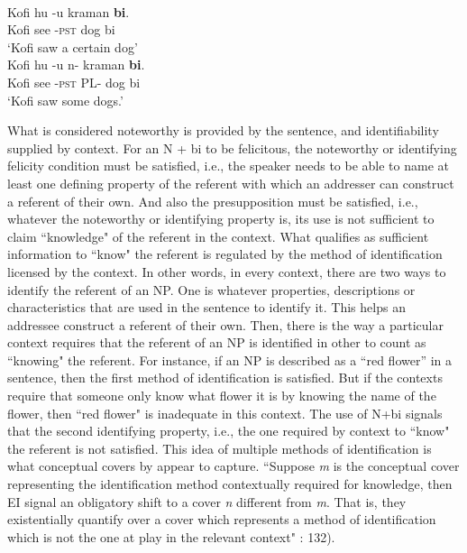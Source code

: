 \documentclass[output=paper,modfonts,nonflat,draftmode]{langsci/langscibook}
\begin{document}
\ea {}\\
\ea\label{owusu:ex60}
\gll Kofi hu -u kraman \textbf{bi}.\\
Kofi see -\textsc{pst} dog bi\\
\glt `Kofi saw a certain dog'\\
	
\ex \label{owusu:ex61}
\gll Kofi hu -u n-  kraman \textbf{bi}.\\
     Kofi see -\textsc{pst} PL- dog bi\\
\glt     `Kofi saw some dogs.' 

 \z\z What is considered noteworthy is provided by the sentence, and identifiability supplied by context. 
For an N + bi to be felicitous, the noteworthy or identifying felicity condition must be satisfied, i.e., the speaker needs to be able to name at least one defining property of the referent with which an addresser can construct a referent of their own. And also the presupposition must be satisfied, i.e., whatever the noteworthy or identifying property is, its use is not sufficient to claim ``knowledge" of the referent in the context. What qualifies as sufficient information to ``know" the referent is regulated by the method of identification licensed by the context. In other words, in every context, there are two ways to identify the referent of an NP. One is whatever properties, descriptions or characteristics that are used in the sentence to identify it. This helps an addressee construct a referent of their own. Then, there is the way a particular context requires that the referent of an NP is identified in other to count as ``knowing" the referent. For instance, if an NP is described as a ``red flower'' in a sentence, then the first method of identification is satisfied. But if the contexts require that someone only know what flower it is by knowing the name of the flower, then ``red flower" is inadequate in this context. The use of N+bi signals that the second identifying property, i.e., the one required by context to ``know" the referent is not satisfied. This idea of multiple methods of identification is what conceptual covers by \citet{AloniPort2015} appear to capture. ``Suppose \emph{m} is the conceptual cover representing the identification method contextually required for knowledge, then EI signal an obligatory shift to a cover \emph{n} different from \emph{m}. That is, they existentially quantify over a cover which represents a method of identification which is not the one at play in the relevant context" \citep{AloniPort2015}: 132). 
\end{document}
